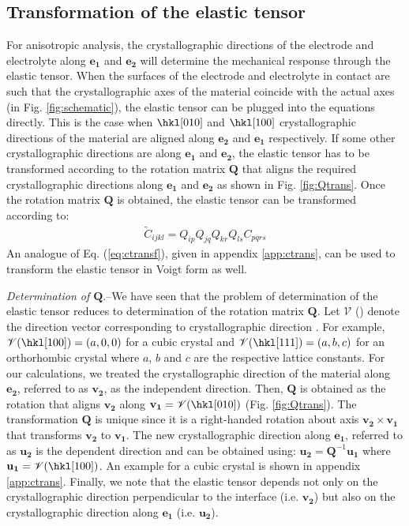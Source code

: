 \documentclass[%
reprint,
 amsmath,amssymb,
 aps,
 prb,
]{revtex4-1}
\newcommand*{\rtten}[1]{\mathbf{\boldsymbol{#1}}}
\newcommand*{\rtvec}[1]{\mathbf{#1}}
\begin{document}
\subsection{Transformation of the elastic tensor}\label{sec:ctrans}
For anisotropic analysis, the crystallographic directions of the electrode and electrolyte along $\rtvec{e_1}$ and $\rtvec{e_2}$ will determine the mechanical response through the elastic tensor. When the surfaces of the electrode and electrolyte in contact are such that the crystallographic axes of the material coincide with the actual axes (in Fig. \ref{fig:schematic}), the elastic tensor can be plugged into the equations directly. This is the case when $\hkl[0 1 0]$ and $\hkl[1 0 0]$ crystallographic directions of the material are aligned along $\rtvec{e_2}$ and $\rtvec{e_1}$ respectively. If some other crystallographic directions are along $\rtten{e_1}$ and $\rtten{e_2}$, the elastic tensor has to be transformed according to the rotation matrix $\rtten{Q}$ that aligns the required crystallographic directions along $\rtvec{e_1}$ and $\rtvec{e_2}$ as shown in Fig. \ref{fig:Qtrans}. Once the rotation matrix $\rtten{Q}$ is obtained, the elastic tensor can be transformed according to:
\begin{eqnarray}\label{eq:ctransf}
\tilde{C}_{ijkl}=Q_{ip}Q_{jq}Q_{kr}Q_{ls}C_{pqrs}
\end{eqnarray}
An analogue of Eq. (\ref{eq:ctransf}), given in appendix \ref{app:ctrans}, can be used to transform the elastic tensor in Voigt form as well.

\emph{Determination of $\rtten{Q}$}.--We have seen that the problem of determination of the elastic tensor reduces to determination of the rotation matrix $\rtten{Q}$. Let $\mathscr{V}$ (\hkl[h k l]) denote the direction vector corresponding to crystallographic direction \hkl[h k l]. For example, $\mathscr{V}(\hkl[1 0 0])=(a,0,0)$ for a cubic crystal and $\mathscr{V}(\hkl[1 1 1])=(a,b,c)$ for an orthorhombic crystal where $a$, $b$ and $c$ are the respective lattice constants. For our calculations, we treated the crystallographic direction of the material along $\rtvec{e_2}$, referred to as $\rtvec{v_2}$, as the independent direction. Then, $\rtten{Q}$ is obtained as the rotation that aligns $\rtvec{v_2}$ along $\rtvec{v_1}=\mathscr{V}(\hkl[0 1 0])$ (Fig. \ref{fig:Qtrans}). The transformation $\rtten{Q}$ is unique since it is a right-handed rotation about axis $\rtvec{v_2}\times \rtvec{v_1}$ that transforms $\rtvec{v_2}$ to $\rtvec{v_1}$. The new crystallographic direction along $\rtvec{e_1}$, referred to as $\rtvec{u_2}$ is the dependent direction and can be obtained using: $\rtvec{u_2}=\rtten{Q}^{-1}\rtvec{u_1}$ where $\rtvec{u_1}=\mathscr{V}(\hkl[1 0 0])$. An example for a cubic crystal is shown in appendix \ref{app:ctrans}. Finally, we note that the elastic tensor depends not only on the crystallographic direction perpendicular to the interface (i.e. $\rtten{v_2}$) but also on the crystallographic direction along $\rtvec{e_1}$ (i.e. $\rtten{u_2}$). 
\end{document}
